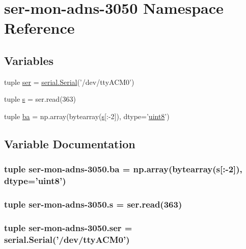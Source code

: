 \hypertarget{namespaceser-mon-adns-3050}{\section{ser-\/mon-\/adns-\/3050 Namespace Reference}
\label{namespaceser-mon-adns-3050}
}
\subsection*{Variables}
\begin{DoxyCompactItemize}
\item 
tuple \hyperlink{namespaceser-mon-adns-3050_aeb75b8d2274f52835b8a3c670650abc1}{ser} = \hyperlink{HardwareSerial_8h_a7b8c4a195c58f9eb8750e94955c5aa4b}{serial.\-Serial}('/dev/tty\-A\-C\-M0')
\item 
tuple \hyperlink{namespaceser-mon-adns-3050_a292f31fb2fd0e796b495e18bddd6371c}{s} = ser.\-read(363)
\item 
tuple \hyperlink{namespaceser-mon-adns-3050_a0e229bbf6215af5bfc987333a7c5d3ab}{ba} = np.\-array(bytearray(\hyperlink{namespaceser-mon-adns-3050_a292f31fb2fd0e796b495e18bddd6371c}{s}\mbox{[}\-:-\/2\mbox{]}), dtype='\hyperlink{md5_8h_a2d25bcd37166cc98f0d823cdb8c553ef}{uint8}')
\end{DoxyCompactItemize}


\subsection{Variable Documentation}
\hypertarget{namespaceser-mon-adns-3050_a0e229bbf6215af5bfc987333a7c5d3ab}{
\subsubsection[{ba}]{\setlength{\rightskip}{0pt plus 5cm}tuple {\bf ser}-\/mon-\/adns-\/3050.ba = np.\-array(bytearray({\bf s}\mbox{[}\-:-\/2\mbox{]}), dtype='{\bf uint8}')}}\label{namespaceser-mon-adns-3050_a0e229bbf6215af5bfc987333a7c5d3ab}
\hypertarget{namespaceser-mon-adns-3050_a292f31fb2fd0e796b495e18bddd6371c}{
\subsubsection[{s}]{\setlength{\rightskip}{0pt plus 5cm}tuple {\bf ser}-\/mon-\/adns-\/3050.s = ser.\-read(363)}}\label{namespaceser-mon-adns-3050_a292f31fb2fd0e796b495e18bddd6371c}
\hypertarget{namespaceser-mon-adns-3050_aeb75b8d2274f52835b8a3c670650abc1}{
\subsubsection[{ser}]{\setlength{\rightskip}{0pt plus 5cm}tuple ser-\/mon-\/adns-\/3050.ser = {\bf serial.\-Serial}('/dev/tty\-A\-C\-M0')}}\label{namespaceser-mon-adns-3050_aeb75b8d2274f52835b8a3c670650abc1}
